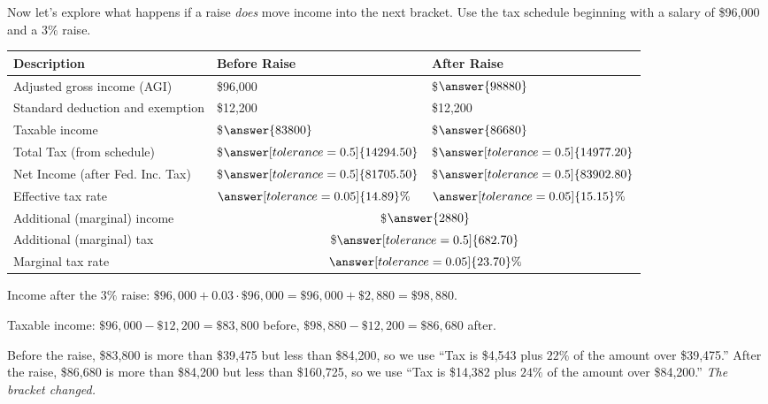 \documentclass[12pt]{ximera}
\begin{document}
\begin{problem}
Now let's explore what happens if a raise \emph{does} move income into the next
bracket. Use the tax schedule beginning with a salary of \$96,000 and a $3\%$ raise.

\begin{center}
\begin{tabular}{|l|l|l|}
\hline
Description & Before Raise & After Raise \\
\hline
Adjusted gross income (AGI) & \$96,000 & \$$\answer{98880}$ \\
\hline
Standard deduction and exemption & \$12,200 & \$12,200 \\
\hline
Taxable income & \$$\answer{83800}$ & \$$\answer{86680}$ \\
\hline
Total Tax (from schedule) & \$$\answer[tolerance=0.5]{14294.50}$ & \$$\answer[tolerance=0.5]{14977.20}$ \\
\hline
Net Income (after Fed. Inc. Tax) & \$$\answer[tolerance=0.5]{81705.50}$ & \$$\answer[tolerance=0.5]{83902.80}$ \\
\hline
Effective tax rate & $\answer[tolerance=0.05]{14.89}\%$ & $\answer[tolerance=0.05]{15.15}\%$ \\
\hline
Additional (marginal) income & \multicolumn{2}{c|}{\$$\answer{2880}$} \\
\hline
Additional (marginal) tax & \multicolumn{2}{c|}{\$$\answer[tolerance=0.5]{682.70}$} \\
\hline
Marginal tax rate & \multicolumn{2}{c|}{$\answer[tolerance=0.05]{23.70}\%$} \\
\hline
\end{tabular}
\end{center}

\begin{solution}
Income after the $3\%$ raise:
$\$96{,}000 + 0.03 \cdot \$96{,}000 = \$96{,}000 + \$2{,}880 = \$98{,}880$.

Taxable income: $\$96{,}000 - \$12{,}200 = \$83{,}800$ before,
$\$98{,}880 - \$12{,}200 = \$86{,}680$ after.

Before the raise, \$83,800 is more than \$39,475 but less than \$84,200, so we use
``Tax is \$4,543 plus $22\%$ of the amount over \$39,475.'' After the raise,
\$86,680 is more than \$84,200 but less than \$160,725, so we use ``Tax is \$14,382
plus $24\%$ of the amount over \$84,200.'' \emph{The bracket changed.}


\end{solution}
\end{problem}
\end{document}
